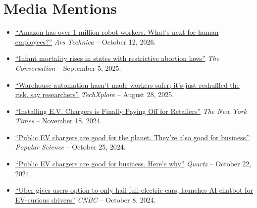 \documentclass[10.5pt,letterpaper,sans]{moderncv}        %
\begin{document}
\section{Media Mentions}

\begin{itemize}

\item \textcolor{gray}{\href{https://arstechnica.com/ai/2026/10/inside-amazons-robotic-arms-race-and-what-it-means-for-the-future-of-human-work/}{``Amazon has over 1 million robot workers. What's next for human employees?''}} \textit{Ars Technica} -- October 12, 2026.

\item \textcolor{gray}{\href{https://theconversation.com/infant-mortality-rises-in-states-with-restrictive-abortion-laws-new-research-263707}{``Infant mortality rises in states with restrictive abortion laws''}} \textit{The Conversation} -- September 5, 2025.

\item \textcolor{gray}{\href{https://techxplore.com/news/2025-08-warehouse-automation-hasnt-workers-safer.html}{``Warehouse automation hasn't made workers safer; it's just reshuffled the risk, say researchers''}} \textit{TechXplore} -- August 28, 2025.

\item \textcolor{gray}{\href{https://www.nytimes.com/2024/11/18/business/ev-chargers-store-parking-lots.html}{``Installing E.V. Chargers is Finally Paying Off for Retailers''}} \textit{The New York Times} -- November 18, 2024.

\item \textcolor{gray}{\href{https://www.popsci.com/technology/public-ev-chargers-are-good-for-the-planet-theyre-also-good-for-business/}{``Public EV chargers are good for the planet. They're also good for business.''}} \textit{Popular Science} -- October 25, 2024.

\item \textcolor{gray}{\href{https://qz.com/public-ev-chargers-business-electric-vehicles-cars-1851678074}{``Public EV chargers are good for business. Here's why''}} \textit{Quartz} -- October 22, 2024.

\item \textcolor{gray}{\href{https://www.cnbc.com/2024/10/08/uber-offers-option-of-only-full-electric-vehicles-launches-ai-chatbot.html}{``Uber gives users option to only hail full-electric cars, launches AI chatbot for EV-curious drivers''}} \textit{CNBC} -- October 8, 2024.


\end{itemize}
\end{document}
